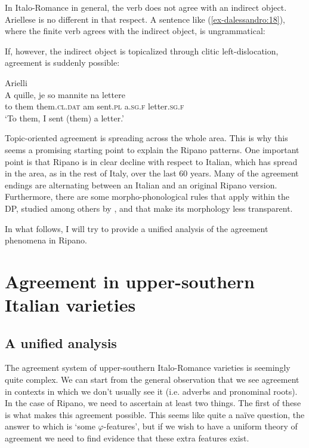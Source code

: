 \documentclass[output=paper
,modfonts
,nonflat]{langsci/langscibook}
\begin{document}
In Italo-Romance in general, the verb does not agree with an indirect object. Ariellese is no different in that respect. A sentence like (\ref{ex-dalessandro:18}), where the finite verb agrees with the indirect object, is ungrammatical:

\begin{exe}
 \label{ex-dalessandro:18}
\end{exe}
If, however, the indirect object is topicalized through clitic left-dislocation, agreement is suddenly possible:

\begin{exe}
\ex Arielli\\
\gll A quille, je   so mannite   na   lettere\\
to them  them.\textsc{cl.dat} am sent.\textsc{pl} a.\textsc{sg.f} letter.\textsc{sg.f}\\
\glt `To them, I sent (them) a letter.'
\end{exe}
Topic-oriented agreement is spreading across the whole area. This is why this seems a promising starting point to explain the Ripano patterns. One important point is that Ripano is in clear decline with respect to Italian, which has spread in the area, as in the rest of Italy, over the last 60 years. Many of the agreement endings are alternating between an Italian and an original Ripano version. Furthermore, there are some morpho-phonological rules that apply within the DP, studied among others by \citet{Paciaroni_Loporcaro2018}, and that make its morphology less transparent. 

In what follows, I will try to provide a unified analysis of the agreement phenomena in Ripano.

\section{Agreement in upper-southern Italian varieties} \label{sec-dalessandro:3}
\subsection{A unified analysis} \label{sec-dalessandro:3.1}
The agreement system of upper-southern Italo-Romance varieties is seemingly quite complex. We can start from the general observation that we see agreement in contexts in which we don’t usually see it (i.e. adverbs and pronominal roots). In the case of Ripano, we need to ascertain at least two things. The first of these is what makes this agreement possible. This seems like quite a naïve question, the answer to which is ‘some $\varphi $-features’, but if we wish to have a uniform theory of agreement we need to find evidence that these extra features exist.
\end{document}
